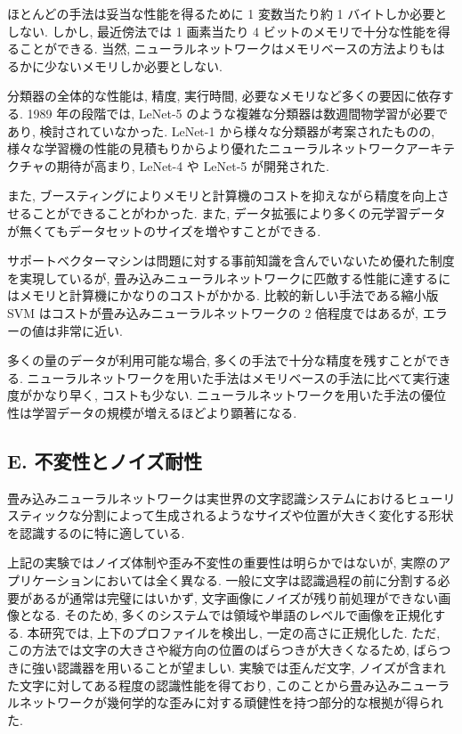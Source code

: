 \documentclass[twocolumn]{jarticle}     %
\begin{document}
ほとんどの手法は妥当な性能を得るために 1 変数当たり約 1 バイトしか必要としない. しかし, 最近傍法では  1 画素当たり 4 ビットのメモリで十分な性能を得ることができる.
当然, ニューラルネットワークはメモリベースの方法よりもはるかに少ないメモリしか必要としない.
\par
分類器の全体的な性能は, 精度, 実行時間, 必要なメモリなど多くの要因に依存する. 
1989 年の段階では, LeNet-5 のような複雑な分類器は数週間物学習が必要であり, 検討されていなかった.
LeNet-1 から様々な分類器が考案されたものの, 様々な学習機の性能の見積もりからより優れたニューラルネットワークアーキテクチャの期待が高まり, LeNet-4 や LeNet-5 が開発された.
\par
また, ブースティングによりメモリと計算機のコストを抑えながら精度を向上させることができることがわかった.
また, データ拡張により多くの元学習データが無くてもデータセットのサイズを増やすことができる.
\par
サポートベクターマシンは問題に対する事前知識を含んでいないため優れた制度を実現しているが, 畳み込みニューラルネットワークに匹敵する性能に達するにはメモリと計算機にかなりのコストがかかる. 
比較的新しい手法である縮小版 SVM はコストが畳み込みニューラルネットワークの 2 倍程度ではあるが, エラーの値は非常に近い. 
\par
多くの量のデータが利用可能な場合, 多くの手法で十分な精度を残すことができる. ニューラルネットワークを用いた手法はメモリベースの手法に比べて実行速度がかなり早く, コストも少ない.
ニューラルネットワークを用いた手法の優位性は学習データの規模が増えるほどより顕著になる.
\subsection*{E. 不変性とノイズ耐性}
畳み込みニューラルネットワークは実世界の文字認識システムにおけるヒューリスティックな分割によって生成されるようなサイズや位置が大きく変化する形状を認識するのに特に適している.
\par
上記の実験ではノイズ体制や歪み不変性の重要性は明らかではないが, 実際のアプリケーションにおいては全く異なる.
一般に文字は認識過程の前に分割する必要があるが通常は完璧にはいかず, 文字画像にノイズが残り前処理ができない画像となる.
そのため, 多くのシステムでは領域や単語のレベルで画像を正規化する. 本研究では, 上下のプロファイルを検出し, 一定の高さに正規化した. ただ, この方法では文字の大きさや縦方向の位置のばらつきが大きくなるため, ばらつきに強い認識器を用いることが望ましい. 実験では歪んだ文字, ノイズが含まれた文字に対してある程度の認識性能を得ており, このことから畳み込みニューラルネットワークが幾何学的な歪みに対する頑健性を持つ部分的な根拠が得られた.
\end{document}
